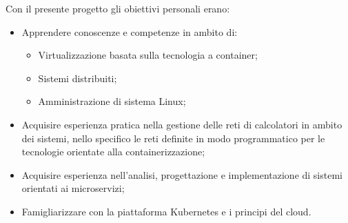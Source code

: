 Con il presente progetto gli obiettivi personali erano:

\begin{itemize}
	\item Apprendere conoscenze e competenze in ambito di:
		\begin{itemize}
			\item Virtualizzazione basata sulla tecnologia a container; 
			\item Sistemi distribuiti;
			\item Amministrazione di sistema Linux;
	    \end{itemize}
	\item Acquisire esperienza pratica nella gestione delle reti di calcolatori in ambito dei sistemi, nello specifico le reti definite in modo programmatico per le tecnologie orientate alla containerizzazione; 
	\item Acquisire esperienza nell'analisi, progettazione e implementazione di sistemi orientati ai microservizi;
	\item Famigliarizzare con la piattaforma Kubernetes e i principi del \gls{cloud}.
\end{itemize} 


